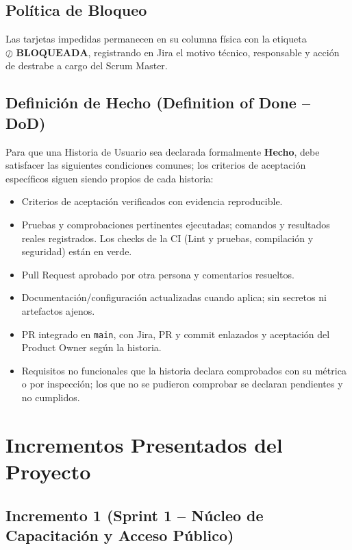 \documentclass[11pt,a4paper]{article}
\begin{document}
\subsection{Política de Bloqueo}
Las tarjetas impedidas permanecen en su columna física con la etiqueta $\mathbf{\oslash\text{ BLOQUEADA}}$, registrando en Jira el motivo técnico, responsable y acción de destrabe a cargo del Scrum Master.

\subsection{Definición de Hecho (Definition of Done -- DoD)}
Para que una Historia de Usuario sea declarada formalmente \textbf{Hecho}, debe satisfacer las siguientes condiciones comunes; los criterios de aceptación específicos siguen siendo propios de cada historia:
\begin{itemize}[leftmargin=*]
    \item[\checkmark] Criterios de aceptación verificados con evidencia reproducible.
    \item[\checkmark] Pruebas y comprobaciones pertinentes ejecutadas; comandos y resultados reales registrados. Los checks de la CI (Lint y pruebas, compilación y seguridad) están en verde.
    \item[\checkmark] Pull Request aprobado por otra persona y comentarios resueltos.
    \item[\checkmark] Documentación/configuración actualizadas cuando aplica; sin secretos ni artefactos ajenos.
    \item[\checkmark] PR integrado en \texttt{main}, con Jira, PR y commit enlazados y aceptación del Product Owner según la historia.
    \item[\checkmark] Requisitos no funcionales que la historia declara comprobados con su métrica o por inspección; los que no se pudieron comprobar se declaran pendientes y no cumplidos.
\end{itemize}

\section{Incrementos Presentados del Proyecto}
\subsection{Incremento 1 (Sprint 1 -- Núcleo de Capacitación y Acceso Público)}
\end{document}
